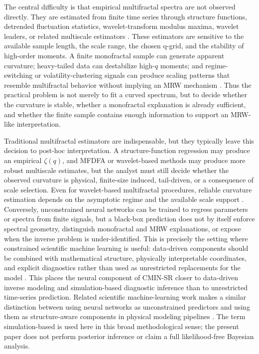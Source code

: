 The central difficulty is that empirical multifractal spectra are not observed
directly. They are estimated from finite time series through structure
functions, detrended fluctuation statistics, wavelet-transform modulus maxima,
wavelet leaders, or related multiscale estimators
\cite{muzy1991wavelets,muzy1993multifractal,arneodo1995thermodynamics,kantelhardt2002mfdfa,jaffard2007wavelet,wendt2007bootstrap}.
These
estimators are sensitive to the available sample length, the scale range, the
chosen q-grid, and the stability of high-order moments. A finite monofractal
sample can generate apparent curvature; heavy-tailed data can destabilize
high-\(q\) moments; and regime-switching or volatility-clustering signals can
produce scaling patterns that resemble multifractal behavior without implying
an MRW mechanism
\cite{bouchaud2000apparent,ludescher2011finite,grech2013spurious,zhou2009components,barunik2012source}.
Thus the practical problem is not merely to fit a curved spectrum, but to
decide whether the curvature is stable, whether a monofractal explanation is
already sufficient, and whether the finite sample contains enough information
to support an MRW-like interpretation.

Traditional multifractal estimators are indispensable, but they typically leave
this decision to post-hoc interpretation. A structure-function regression may
produce an empirical \(\zeta(q)\), and MFDFA or wavelet-based methods may
produce more robust multiscale estimates, but the analyst must still decide
whether the observed curvature is physical, finite-size induced, tail-driven,
or a consequence of scale selection. Even for wavelet-based multifractal
procedures, reliable curvature estimation depends on the asymptotic regime and
the available scale support \cite{mallat1992singularity,bacry2010mixed}.
Conversely, unconstrained neural networks
can be trained to regress parameters or spectra from finite signals, but a
black-box prediction does not by itself enforce spectral geometry, distinguish
monofractal and MRW explanations, or expose when the inverse problem is
under-identified. This is precisely the setting where constrained scientific
machine learning is useful: data-driven components should be combined with
mathematical structure, physically interpretable coordinates, and explicit
diagnostics rather than used as unrestricted replacements for the model
\cite{arridge2019inverse,cranmer2020sbi,raissi2019pinn,karniadakis2021piml}.
This places the neural component of CMIN-SR closer to data-driven inverse
modeling and simulation-based diagnostic inference than to unrestricted
time-series prediction. Related scientific machine-learning work makes a
similar distinction between using neural networks as unconstrained predictors
and using them as structure-aware components in physical modeling pipelines
\cite{brunton2020mlfluid,karniadakis2021piml}. The term
simulation-based is used here in this broad methodological sense; the present
paper does not perform posterior inference or claim a full likelihood-free
Bayesian analysis.

